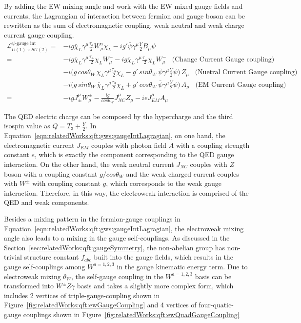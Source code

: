 \noindent By adding the EW mixing angle and work with the EW mixed gauge fields and currents, the Lagrangian of interaction between fermion and gauge boson can be rewritten as the sum of electromagnetic coupling, weak neutral and weak charge current gauge coupling.
\begin{equation}
\begin{split}
    \mathcal{L}_{U(1)\times SU(2)}^{\text{$\psi$-gauge int}} 
    =& -ig \bar{\chi}_L  \gamma^\mu \frac{\tau_a}{2} W^a_\mu \chi_L - ig' \bar{\psi}  \gamma^\mu \frac{Y}{2} B_\mu \psi  \\
    =& -ig \bar{\chi}_L  \gamma^\mu \frac{\tau_+}{2} \chi_L W^+_\mu -ig \bar{\chi}_L  \gamma^\mu \frac{\tau_-}{2} \chi_L W^-_\mu  \;\;\; \text{(Change Current Gauge coupling)} \\
    & -i \big( g\,cos\theta_W \,  \bar{\chi}_L \gamma^\mu   \frac{\tau_3}{2} \chi_L - g'\,sin\theta_W \,  \bar{\psi} \gamma^\mu   \frac{Y}{2} \psi \big)  \, Z_\mu  \;\;\; \text{(Nuetral Current Gauge coupling)} \\
    & -i \big( g\,sin\theta_W \,  \bar{\chi}_L \gamma^\mu   \frac{\tau_3}{2} \chi_L + g'\,cos\theta_W \,  \bar{\psi} \gamma^\mu   \frac{Y}{2} \psi \big)  \, A_\mu  \;\;\; \text{(EM Current Gauge coupling)}\\
    = &-ig J^\mu_\pm W_\mu^\pm - \frac{ig}{cos\theta_W} J^\mu_{NC} Z_\mu - ie J^{\mu}_{EM} A_\mu
\end{split}
\label{eqn:relatedWorks:qft:gws:gaugeIntLagragian}
\end{equation}

\noindent The QED electric charge can be composed by the hypercharge and the third isospin value as $Q = T_3  +\frac{Y}{2}$. In Equation~\ref{eqn:relatedWorks:qft:gws:gaugeIntLagragian}, on one hand, the electromagnetic current $J_{EM}$ couples with photon field $A$ with a coupling strength constant $e$, which is exactly the component corresponding to the QED gauge interaction. On the other hand, the weak neutral current $J_{NC}$ couples with $Z$ boson with a coupling constant $g/cos\theta_W$ and the weak charged current couples with $W^\pm$ with coupling constant $g$, which corresponds to the weak gauge interaction. Therefore, in this way, the electroweak interaction is comprised of the QED and weak components.

Besides a mixing pattern in the fermion-gauge couplings in Equation~\ref{eqn:relatedWorks:qft:gws:gaugeIntLagragian}, the electroweak mixing angle also leads to a mixing in the gauge self-couplings.  As discussed in the Section~\ref{sec:relatedWorks:qft:gaugeSymmetry}, the non-abelian group has non-trivial structure constant $f_{abc}$ built into the gauge fields, which results in the gauge self-couplings among $W^{a=1,2,3}$ in the gauge kinematic energy term. Due to electroweak mixing $\theta_W$, the self-gauge coupling in the $W^{a=1,2,3}$ basis can be transformed into $W^\pm Z \gamma$ basis and takes a slightly more complex form, which includes 2 vertices of triple-gauge-coupling shown in Figure~\ref{fig:relatedWorks:qft:ewGaugeCoupling} and 4 vertices of four-quatic-gauge couplings shown in Figure~\ref{fig:relatedWorks:qft:ewQuadGaugeCoupling}

